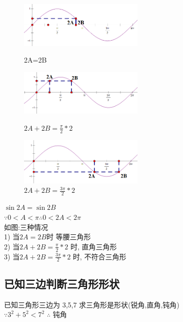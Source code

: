 \documentclass[hyperref, UTF8,11pt,a4paper]{ctexart} %
\begin{document}
\begin{figure}[htbp] %
	\centering
	\begin{minipage}{170pt}
		\centering
		\includegraphics[width=170pt]  {pic/zhengyuxian/2A=2B.png}
		\caption{2A=2B}
	\end{minipage}
	\hspace{10pt}
	\begin{minipage}{170pt}
		\centering
		\includegraphics[width=170pt]  {pic/zhengyuxian/2A=2B1.png}
		\caption{$ 2A+2B= \frac{\pi}{2} * 2 $}
	\end{minipage}
	\hspace{10pt}
	\begin{minipage}{170pt}
		\centering
		\includegraphics[width=170pt]  {pic/zhengyuxian/2A=2B2.png}
		\caption{$ 2A+2B= \frac{3\pi}{2} * 2 $}
	\end{minipage}
\end{figure}

{\color{red} $ \sin 2A= \sin 2B$ } \\

$\because 0<A<\pi \therefore 0<2A<2\pi$ \\
如图:三种情况 \\
1) 当$ 2A=2B $时 等腰三角形 \\
2) 当$ 2A+2B= \frac{\pi}{2} * 2 $ 时, 直角三角形 \\
3) 当$ 2A+2B= \frac{3\pi}{2} * 2 $ 时, 不符合三角形 \\




\subsection{已知三边判断三角形形状}
{\color{red} 已知三角形三边为 3,5,7 求三角形是形状(锐角,直角,钝角) } \\
$\because 3^{2}+5^{2}<7^{2}$ $\therefore$ 钝角
\end{document}
